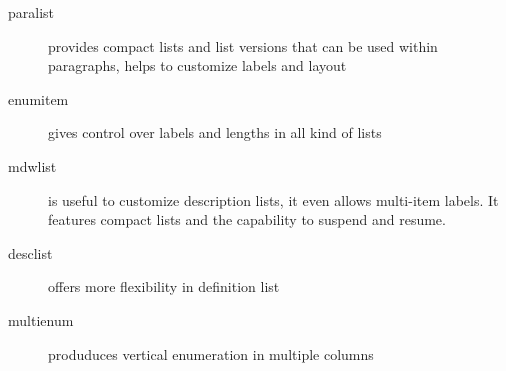\documentclass{article}
\begin{document}
\begin{description}
  \item[paralist] provides compact lists and list versions that can be used within paragraphs, helps to customize labels and layout
  \item [enumitem] gives control over labels and lengths in all kind of lists
  \item [mdwlist]  is useful to customize description lists, it even allows multi-item labels. It features compact lists and the capability to suspend and resume.
  \item [desclist] offers more flexibility in definition list
  \item [multienum] produduces vertical enumeration in multiple columns
\end{description}
\end{document}
